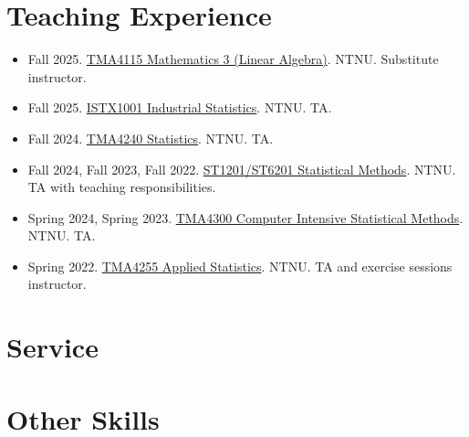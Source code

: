 \documentclass[12pt,a4paper]{moderncv}
\begin{document}
\section{Teaching Experience}
\begin{itemize}
  \item Fall 2025. \href{https://www.ntnu.edu/studies/courses/TMA4115\#tab=omEmnet}{TMA4115 Mathematics 3 (Linear Algebra)}. NTNU. Substitute instructor.
  \item Fall 2025. \href{https://www.ntnu.edu/studies/courses/ISTT1001\#tab=omEmnet}{ISTX1001 Industrial Statistics}. NTNU. TA.
  \item Fall 2024. \href{https://www.ntnu.edu/studies/courses/TMA4240\#tab=omEmnet}{TMA4240 Statistics}. NTNU. TA.
  \item Fall 2024, Fall 2023, Fall 2022. \href{https://www.ntnu.edu/studies/courses/ST1201\#tab=omEmnet}{ST1201/ST6201 Statistical Methods}. NTNU. TA with teaching responsibilities.
  \item Spring 2024, Spring 2023. \href{https://www.ntnu.edu/studies/courses/TMA4300\#tab=omEmnet}{TMA4300 Computer Intensive Statistical Methods}. NTNU. TA.
  \item Spring 2022. \href{https://www.ntnu.edu/studies/courses/TMA4255\#tab=omEmnet}{TMA4255 Applied Statistics}. NTNU. TA and exercise sessions instructor.
\end{itemize}

\section{Service}
\section{Other Skills}
\vspace{0.3em}
\end{document}
